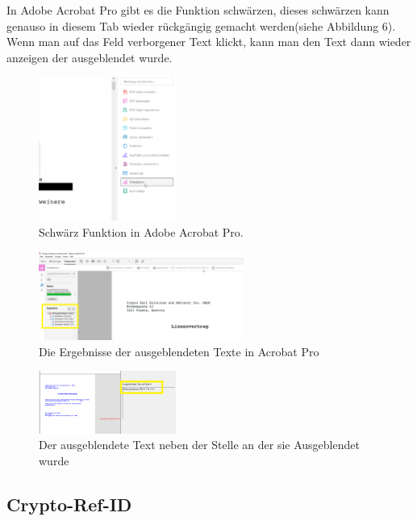 \documentclass[12pt,a4paper,titlepage,oneside]{scrartcl}
\begin{document}
In Adobe Acrobat Pro gibt es die Funktion schwärzen, dieses schwärzen kann genauso in diesem Tab wieder rückgängig gemacht werden(siehe Abbildung 6). 
Wenn man auf das Feld verborgener Text klickt, kann man den Text dann wieder anzeigen der ausgeblendet wurde. 

\begin{figure}[h!]
  \centering
    \includegraphics[width=0.4\textwidth]{./imgs/Forensik/hidden_text_Klick.png}
  \caption{Schwärz Funktion in Adobe Acrobat Pro.}
  \label{fig:hiddentext100}
\end{figure}


\begin{figure}[h!]
  \centering
    \includegraphics[width=0.6\textwidth]{./imgs/Forensik/hidden_text1.png}
  \caption{Die Ergebnisse der ausgeblendeten Texte in Acrobat Pro}
  \label{fig:hiddentext1}
\end{figure}

\begin{figure}[h!]
  \centering
    \includegraphics[width=0.4\textwidth]{./imgs/Forensik/hidden_text3.png}
  \caption{Der ausgeblendete Text neben der Stelle an der sie Ausgeblendet wurde}
  \label{fig:hiddentext2}
\end{figure}

\pagebreak

\subsection{Crypto-Ref-ID}
\end{document}
